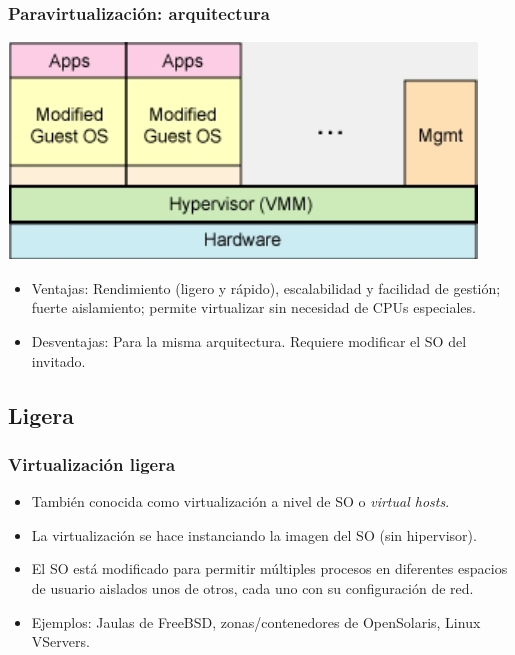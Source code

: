 \documentclass{beamer}
\begin{document}
\begin{frame}
\frametitle{Paravirtualización: arquitectura}
\begin{center}
\includegraphics[scale=0.35,clip=false]{figs/paravirt.png}
\end{center}

\begin{itemize}
\item \alert{Ventajas:} Rendimiento (ligero y rápido), escalabilidad y facilidad de gestión; fuerte aislamiento; permite virtualizar sin necesidad de CPUs especiales. 
\item \alert{Desventajas:} Para la misma arquitectura. Requiere modificar el SO del invitado.
\end{itemize}


\end{frame}



\subsection{Ligera}

\begin{frame}
\frametitle{Virtualización ligera}

\begin{itemize}
\item También conocida como \alert{virtualización a nivel de SO} o \textit{virtual hosts}.
\item La virtualización se hace instanciando la imagen del SO (sin hipervisor).
\item El SO está modificado para permitir múltiples procesos en diferentes espacios de usuario aislados unos de otros, cada uno con su configuración de red.
\item \alert{Ejemplos:} Jaulas de FreeBSD, zonas/contenedores de OpenSolaris, Linux VServers. 
\end{itemize}

\end{frame}
\end{document}
